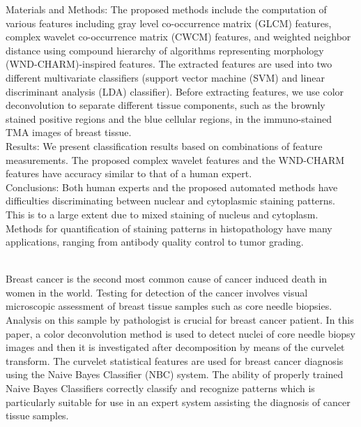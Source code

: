 {{\begin{enumerate}
Materials and Methods: The proposed methods include the computation of various features including gray level co-occurrence matrix (GLCM) features, complex wavelet co-occurrence matrix (CWCM) features, and weighted neighbor distance using compound hierarchy of algorithms representing morphology (WND-CHARM)-inspired features. The extracted features are used into two different multivariate classifiers (support vector machine (SVM) and linear discriminant analysis (LDA) classifier). Before extracting features, we use color deconvolution to separate different tissue components, such as the brownly stained positive regions and the blue cellular regions, in the immuno-stained TMA images of breast tissue. \\
Results: We present classification results based on combinations of feature measurements. The proposed complex wavelet features and the WND-CHARM features have accuracy similar to that of a human expert.\\
Conclusions: Both human experts and the proposed automated methods have difficulties discriminating between nuclear and cytoplasmic staining patterns. This is to a large extent due to mixed staining of nucleus and cytoplasm. Methods for quantification of staining patterns in histopathology have many applications, ranging from antibody quality control to tumor grading.
 
\\ \aabstract
Breast cancer is the second most common cause of cancer induced death in women in the world. Testing for detection of the cancer involves visual microscopic assessment of breast tissue samples such as core needle biopsies. Analysis on this sample by pathologist is crucial for breast cancer patient. In this paper, a color deconvolution method is used to detect nuclei of core needle biopsy images and then it is investigated after decomposition by means of the curvelet transform. The curvelet statistical features are used for breast
 cancer diagnosis using the Naive Bayes Classifier (NBC) system. The ability of properly trained Naive Bayes Classifiers correctly classify and recognize patterns which is particularly suitable for use in an expert system assisting the diagnosis of cancer tissue samples.


\end{enumerate}}}
